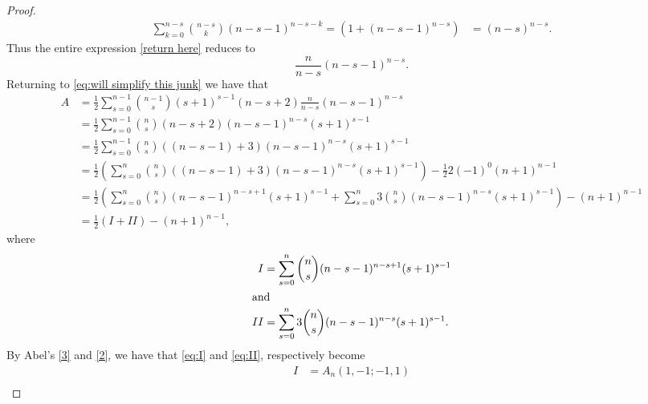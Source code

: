 \documentclass[12pt,reqno]{amsart}
\theoremstyle{definition}
\theoremstyle{remark}
\begin{document}
\begin{proof}
\begin{align}
    \sum_{k=0}^{n-s}\binom{n-s}{k}(n-s-1)^{n-s-k}=(1+(n-s-1)^{n-s})
    &=(n-s)^{n-s}.%
\nonumber\end{align}
Thus the entire expression 
\eqref{return here} reduces to
\[\frac{n}{n-s}(n-s-1)^{n-s}.\]
Returning to \eqref{eq:will simplify this junk} we have that 
\begin{align}
A&=\frac{1}{2}\sum_{s=0}^{n-1}\binom{n-1}{s}(s+1)^{s-1}(n-s+2)\frac{n}{n-s}(n-s-1)^{n-s} \nonumber\\
    &=\frac{1}{2}\sum_{s=0}^{n-1}\binom{n}{s}(n-s+2)(n-s-1)^{n-s}(s+1)^{s-1}\nonumber\\
    &=\frac{1}{2}\sum_{s=0}^{n-1}\binom{n}{s}((n-s-1)+3)(n-s-1)^{n-s}(s+1)^{s-1}\nonumber\\
    &=\frac{1}{2}\left(\sum_{s=0}^{n}\binom{n}{s}((n-s-1)+3)(n-s-1)^{n-s}(s+1)^{s-1}\right)-\frac{1}{2}2(-1)^0(n+1)^{n-1}\nonumber\\
    &=\frac{1}{2}\left(\sum_{s=0}^{n}\binom{n}{s}(n-s-1)^{n-s+1}(s+1)^{s-1}+\sum_{s=0}^{n}3\binom{n}{s}(n-s-1)^{n-s}(s+1)^{s-1}\right)
    -(n+1)^{n-1}\nonumber\\
    &=
    \frac{1}{2}\left(I+II\right)-(n+1)^{n-1},\label{eq:so close}
\end{align}
where 
\begin{align}
    I&=\sum_{s=0}^{n}\binom{n}{s}(n-s-1)^{n-s+1}(s+1)^{s-1}\label{eq:I}\\
    \intertext{and}
    II&=\sum_{s=0}^{n}3\binom{n}{s}(n-s-1)^{n-s}(s+1)^{s-1}\label{eq:II}.
\end{align}
By Abel's \eqref{3} and \eqref{2}, we have that \eqref{eq:I}  and \eqref{eq:II}, respectively become
\begin{align}
    I&=A_n(1,-1;-1,1)\nonumber\\

\end{align}
\end{proof}
\end{document}
